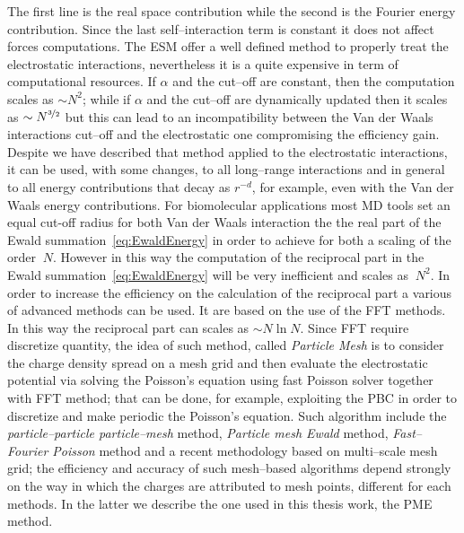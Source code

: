 The first line is the real space contribution while the second is the Fourier energy contribution. Since the last self--interaction term is constant it does not affect forces computations. The \ac{ESM} offer a well defined method to properly treat the electrostatic interactions, nevertheless it is a quite expensive in term of computational resources. If $\alpha$ and the cut--off are constant, then the computation scales as $\sim N^2$; while if $\alpha$ and the cut--off are dynamically updated then it scales as $\sim N^{\nicefrac{3}{2}}$ but this can lead to an incompatibility between the Van der Waals interactions cut--off and the electrostatic one compromising the efficiency gain. Despite we have described that method applied to the electrostatic interactions, it can be used, with some changes, to all long--range interactions and in general to all energy contributions that decay as $r^{-d}$, for example, even with the Van der Waals energy contributions. For biomolecular applications most \ac{MD} tools set an equal cut-off radius for both Van der Waals interaction the the real part of the Ewald summation~\eqref{eq:EwaldEnergy} in order to achieve for both a scaling of the order $~N$. However in this way the computation of the reciprocal part in the Ewald summation~\eqref{eq:EwaldEnergy} will be very inefficient and scales as $~N^2$. In order to increase the efficiency on the calculation of the reciprocal part a various of advanced methods can be used. It are based on the use of the \ac{FFT} methods. In this way the reciprocal part can scales as $\sim N\ln N$. Since \ac{FFT} require discretize quantity, the idea of such method, called \textit{Particle Mesh} is to consider the charge density spread on a mesh grid and then evaluate the electrostatic potential via solving the Poisson's equation using fast Poisson solver together with \ac{FFT} method; that can be done, for example, exploiting the \ac{PBC} in order to discretize and make periodic the Poisson's equation. Such algorithm include the \textit{particle--particle particle--mesh} method, \textit{Particle mesh Ewald} method, \textit{Fast--Fourier Poisson} method and a recent methodology based on multi--scale mesh grid; the efficiency and accuracy of such mesh--based algorithms depend strongly on the way in which the charges are attributed to mesh points, different for each methods. In the latter we describe the one used in this thesis work, the \acf{PME} method.

